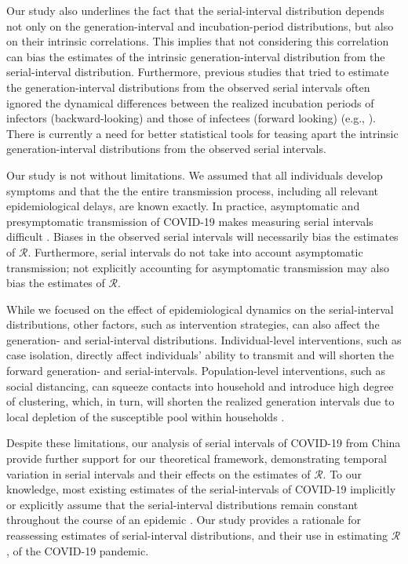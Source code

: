 \documentclass[12pt]{article}
\newcommand{\RR}{\ensuremath{{\mathcal R}}\xspace}
\begin{document}
Our study also underlines the fact that the serial-interval distribution depends not only on the generation-interval and incubation-period distributions, but also on their intrinsic correlations.
This implies that not considering this correlation can bias the estimates of the intrinsic generation-interval distribution from the serial-interval distribution.
Furthermore, previous studies that tried to estimate the generation-interval distributions from the observed serial intervals often ignored the dynamical differences between the realized incubation periods of infectors (backward-looking) and those of infectees (forward looking) (e.g., \cite{klinkenberg2011correlation, ganyani2020estimating}).
There is currently a need for better statistical tools for teasing apart the intrinsic generation-interval distributions from the observed serial intervals.

Our study is not without limitations.
We assumed that all individuals develop symptoms and that the the entire transmission process, including all relevant epidemiological delays, are known exactly.
In practice, asymptomatic and presymptomatic transmission of COVID-19 makes measuring serial intervals difficult \citep{bai2020presumed,he2020temporal,wei2020presymptomatic}.
Biases in the observed serial intervals will necessarily bias the estimates of \RR. 
Furthermore, serial intervals do not take into account asymptomatic transmission; 
not explicitly accounting for asymptomatic transmission may also bias the estimates of \RR \citep{park2020time}.

While we focused on the effect of epidemiological dynamics on the serial-interval distributions, other factors, such as intervention strategies, can also affect the generation- and serial-interval distributions.
Individual-level interventions, such as case isolation, directly affect individuals' ability to transmit and will shorten the forward generation- and serial-intervals.
Population-level interventions, such as social distancing, can squeeze contacts into household and introduce high degree of clustering, which, in turn, will shorten the realized generation intervals due to local depletion of the susceptible pool within households \citep{park2019inferring}.

Despite these limitations, our analysis of serial intervals of COVID-19 from China provide further support for our theoretical framework, demonstrating temporal variation in serial intervals and their effects on the estimates of \RR.
To our knowledge, most existing estimates of the serial-intervals of COVID-19 implicitly or explicitly assume that the serial-interval distributions remain constant throughout the course of an epidemic \citep{du2020serial, he2020temporal, nishiura2020serial,tindale2020transmission,zhao2020estimating,zhang2020evolving}.
Our study provides a rationale for reassessing estimates of serial-interval distributions, and their use in estimating \RR, of the COVID-19 pandemic.
\end{document}
